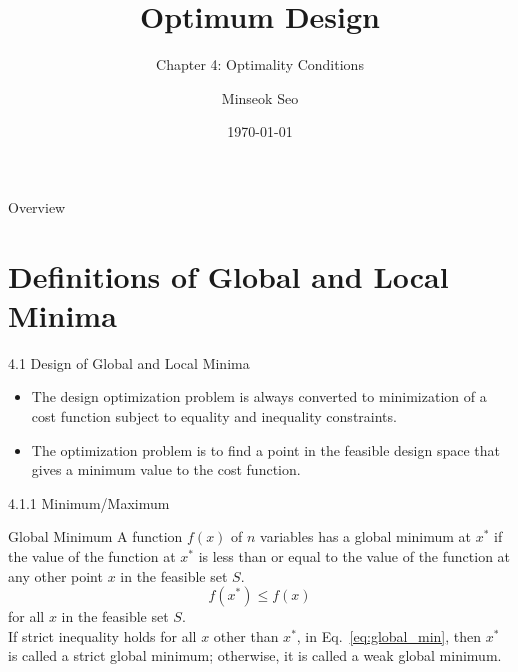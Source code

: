 \documentclass[aspectratio=169,xcolor=dvipsnames]{beamer}
\title{Optimum Design}
\subtitle{Chapter 4: Optimality Conditions}
\author{Minseok Seo}
\institute
{
    Artificial Intelligence Graduate School \\
    Gwangju Institute of Science and Technology (GIST) %
}
\date{\today} %
\begin{document}
\begin{frame}
    \titlepage
\end{frame}

\begin{frame}{Overview}
    \tableofcontents
\end{frame}

\section{Definitions of Global and Local Minima}

\begin{frame}{4.1 Design of Global and Local Minima}

\begin{itemize}
    \item The design optimization problem is always converted to minimization of a cost function subject to equality and inequality constraints.
    \item The optimization problem is to find a point in the feasible design space that gives a minimum value to the cost function.
\end{itemize}
    
\end{frame}


\begin{frame}{4.1.1 Minimum/Maximum}

\begin{block}{Global Minimum}
    A function $f(x)$ of $n$ variables has a global minimum at $x^*$ if the value of the function at $x^*$ is less than or equal to the value of the function at any other point $x$ in the feasible set $S$.
    \begin{equation*} \label{eq:global_min}
        f(x^*) \leq f(x)
    \end{equation*}
    for all $x$ in the feasible set $S$. \\
    If strict inequality holds for all $x$ other than $x^*$, in Eq.~\ref{eq:global_min}, then $x^*$ is called a strict global minimum; otherwise, it is called a weak global minimum.
\end{block}

\end{frame}
\end{document}
